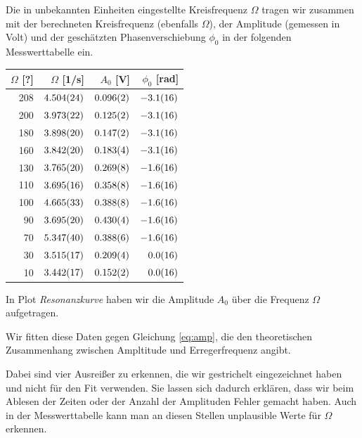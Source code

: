 \documentclass[a4paper,german,12pt,smallheadings]{scrartcl}
\begin{document}
Die in unbekannten Einheiten eingestellte Kreisfrequenz $\Omega$ tragen wir
zusammen mit der berechneten Kreisfrequenz (ebenfalls $\Omega$), der Amplitude
(gemessen in Volt) und der geschätzten Phasenverschiebung $\phi_0$ in der
folgenden Messwerttabelle ein.

\begin{tabular}{r|r|r|r}
  $\Omega$ [?] & $\Omega$ [1/s] & $A_0$ [V] & $\phi_0$ [rad] \\
  \hline
  208 & $\num{4.504+-0.024}$ & $\num{0.096+-0.002}$ & $\num{-3.1+-1.6}$ \\
  200 & $\num{3.973+-0.022}$ & $\num{0.125+-0.002}$ & $\num{-3.1+-1.6}$ \\
  180 & $\num{3.898+-0.020}$ & $\num{0.147+-0.002}$ & $\num{-3.1+-1.6}$ \\
  160 & $\num{3.842+-0.020}$ & $\num{0.183+-0.004}$ & $\num{-3.1+-1.6}$ \\
  130 & $\num{3.765+-0.020}$ & $\num{0.269+-0.008}$ & $\num{-1.6+-1.6}$ \\
  110 & $\num{3.695+-0.016}$ & $\num{0.358+-0.008}$ & $\num{-1.6+-1.6}$ \\
  100 & $\num{4.665+-0.033}$ & $\num{0.388+-0.008}$ & $\num{-1.6+-1.6}$ \\
  90  & $\num{3.695+-0.020}$ & $\num{0.430+-0.004}$ & $\num{-1.6+-1.6}$ \\
  70  & $\num{5.347+-0.040}$ & $\num{0.388+-0.006}$ & $\num{-1.6+-1.6}$ \\
  30  & $\num{3.515+-0.017}$ & $\num{0.209+-0.004}$ & $\num{ 0.0+-1.6}$ \\
  10  & $\num{3.442+-0.017}$ & $\num{0.152+-0.002}$ & $\num{ 0.0+-1.6}$ \\
\end{tabular}

\vspace{1cm}

In Plot \textit{Resonanzkurve} haben wir die Amplitude $A_0$ über die Frequenz
$\Omega$ aufgetragen.

Wir fitten diese Daten gegen Gleichung \ref{eq:amp}, die den theoretischen
Zusammenhang zwischen Ampltitude und Erregerfrequenz angibt.

Dabei sind vier Ausreißer zu erkennen, die wir gestrichelt eingezeichnet haben
und nicht für den Fit verwenden. Sie lassen sich dadurch erklären, dass wir
beim Ablesen der Zeiten oder der Anzahl der Amplituden Fehler gemacht haben.
Auch in der Messwerttabelle kann man an diesen Stellen unplausible Werte für
$\Omega$ erkennen.
\end{document}
